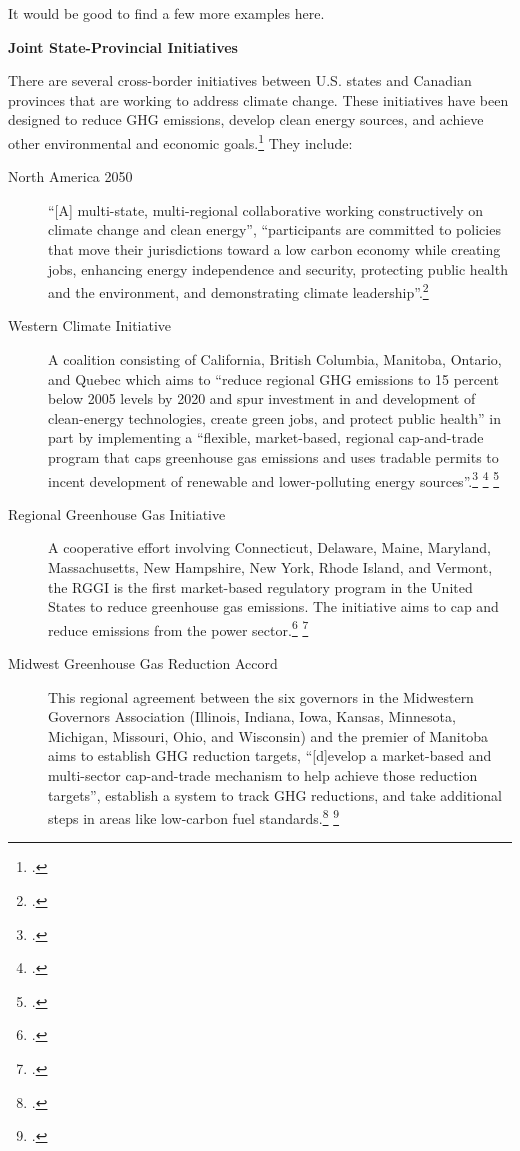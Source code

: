 \begin{vcom}
It would be good to find a few more examples here.
\end{vcom}



\textbf{Joint State-Provincial Initiatives}



There are several cross-border initiatives between U.S. states and Canadian provinces that are working to address climate change. These initiatives have been designed to reduce GHG emissions, develop clean energy sources, and achieve other environmental and economic goals.\footcite[][]{CCESinitiatives} They include:
\begin{description}
	\item[North America 2050] ``[A] multi-state, multi-regional collaborative working constructively on climate change and clean energy'', ``participants are committed to policies that move their jurisdictions toward a low carbon economy while creating jobs, enhancing energy independence and security, protecting public health and the environment, and demonstrating climate leadership''.\footcite[][]{CCESinitiatives}
	\item[Western Climate Initiative] A coalition consisting of California, British Columbia, Manitoba, Ontario, and Quebec which aims to ``reduce regional GHG emissions to 15 percent below 2005 levels by 2020 and spur investment in and development of clean-energy technologies, create green jobs, and protect public health'' in part by implementing a ``flexible, market-based, regional cap-and-trade program that caps greenhouse gas emissions and uses tradable permits to incent development of renewable and lower-polluting energy sources''.\footcite[][]{WCIPartners} \footcite[][]{WCIProgram} \footcite[][]{CCESinitiatives}
	\item[Regional Greenhouse Gas Initiative] A cooperative effort involving Connecticut, Delaware, Maine, Maryland, Massachusetts, New Hampshire, New York, Rhode Island, and Vermont, the RGGI is the first market-based regulatory program in the United States to reduce greenhouse gas emissions. The initiative aims to cap and reduce  emissions from the power sector.\footcite[][]{RGGIWelcome} \footcite[][]{CCESinitiatives}
	\item[Midwest Greenhouse Gas Reduction Accord] This regional agreement between the six governors in the Midwestern Governors Association (Illinois, Indiana, Iowa, Kansas, Minnesota, Michigan, Missouri, Ohio, and Wisconsin) and the premier of Manitoba aims to establish GHG reduction targets, ``[d]evelop a market-based and multi-sector cap-and-trade mechanism to help achieve those reduction targets'', establish a system to track GHG reductions, and take additional steps in areas like low-carbon fuel standards.\footcite[][]{GovsClimatePlatform} \footcite[][]{CCESinitiatives}

\end{description}
